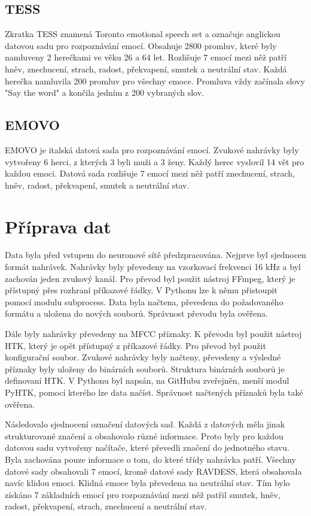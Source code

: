 \documentclass[FM,BP]{tulthesis}
\begin{document}
\subsection{TESS}
Zkratka TESS znamená Toronto emotional speech set a označuje anglickou datovou sadu pro rozpoznávání emocí. Obsahuje 2800 promluv, které byly namluveny 2 herečkami ve věku 26 a 64 let. Rozlišuje 7 emocí mezi něž patří hněv, znechucení, strach, radost, překvapení, smutek a neutrální stav. Každá herečka namluvila 200 promluv pro všechny emoce. Promluva vždy začínala slovy "Say the word" a končila jedním z 200 vybraných slov.\cite{tess}

\subsection{EMOVO}
EMOVO je italská datová sada pro rozpoznávání emocí. Zvukové nahrávky byly vytvořeny 6 herci, z kterých 3 byli muži a 3 ženy. Každý herec vyslovil 14 vět pro každou emoci. Datová sada rozlišuje 7 emocí mezi něž patří znechucení, strach, hněv, radost, překvapení, smutek a neutrální stav.\cite{COSTANTINI14.591}

\section{Příprava dat}
Data byla před vstupem do neuronové sítě předzpracována. Nejprve byl sjednocen formát nahrávek. Nahrávky byly převedeny na vzorkovací frekvenci 16 kHz a byl zachován jeden zvukový kanál. Pro převod byl použit nástroj FFmpeg, který je přístupný přes rozhraní příkazové řádky. V Pythonu lze k němu přistoupit pomocí modulu subprocess. Data byla načtena, převedena do požadovaného formátu a uložena do nových souborů. Správnost převodu byla ověřena.

Dále byly nahrávky převedeny na MFCC příznaky. K převodu byl použit nástroj HTK, který je opět přístupný z příkazové řádky. Pro převod byl použit konfigurační soubor. Zvukové nahrávky byly načteny, převedeny a výsledné příznaky byly uloženy do binárních souborů. Struktura binárních souborů je definovaní HTK. V Pythonu byl napsán, na GitHubu zveřejněn, menší modul PyHTK, pomocí kterého lze data načíst. Správnost načtených příznaků byla také ověřena.

Následovalo sjednocení označení datových sad. Každá z datových měla jinak strukturované značení a obsahovalo různé informace. Proto byly pro každou datovou sadu vytvořeny načítače, které převedli značení do jednotného stavu. Byla zachována pouze informace o tom, do které třídy nahrávka patří. Všechny datové sady obsahovali 7 emocí, kromě datové sady RAVDESS, která obsahovala navíc klidou emoci. Klidná emoce byla převedena na neutrální stav. Tím bylo získáno 7 základních emocí pro rozpoznávání mezi něž patřil smutek, hněv, radost, překvapení, strach, znechucení a neutrální stav.
\end{document}
